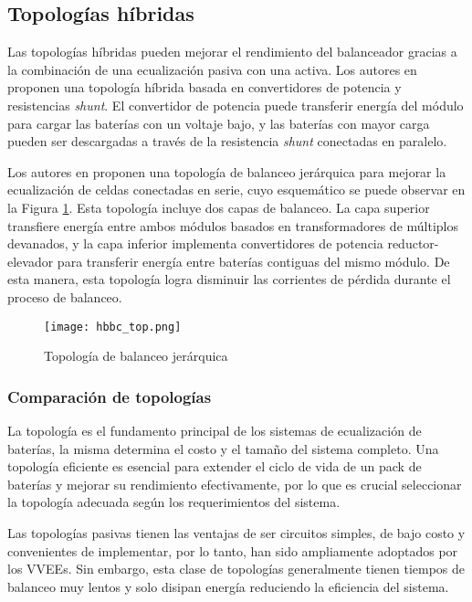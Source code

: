 \subsection{Topolog\'ias h\'ibridas}

Las topolog\'ias h\'ibridas pueden mejorar el rendimiento del balanceador
gracias a la combinaci\'on de una ecualizaci\'on pasiva con una activa. 
Los autores en \cite{fang_bal} proponen una topolog\'ia h\'ibrida basada en 
convertidores de potencia y resistencias \emph{shunt}. El convertidor de 
potencia puede transferir energ\'ia del m\'odulo para cargar las bater\'ias con 
un voltaje bajo, y las bater\'ias con mayor carga pueden ser descargadas a 
trav\'es de la resistencia \emph{shunt} conectadas en paralelo.

Los autores en \cite{zhang_et_al_hier} proponen una topolog\'ia de balanceo 
jer\'arquica para mejorar la ecualizaci\'on de celdas conectadas en serie, cuyo 
esquem\'atico se puede observar en la Figura \ref{hier_bal_top}. Esta 
topolog\'ia incluye dos capas de balanceo. La capa superior transfiere energ\'ia 
entre ambos m\'odulos basados en transformadores de m\'ultiplos devanados, y la 
capa inferior implementa convertidores de potencia reductor-elevador para 
transferir energ\'ia entre bater\'ias contiguas del mismo m\'odulo. De esta 
manera, esta topolog\'ia logra disminuir las corrientes de p\'erdida durante el 
proceso de balanceo.

\begin{figure}[h!]
    \begin{center}
        \texttt{[image: hbbc\_top.png]}
        \caption{Topolog\'ia de balanceo jer\'arquica}
        \label{hier_bal_top}
    \end{center}
\end{figure}

\subsubsection{Comparaci\'on de topolog\'ias}

La topolog\'ia es el fundamento principal de los sistemas de ecualizaci\'on de
bater\'ias, la misma determina el costo y el tamaño del sistema completo. Una
topolog\'ia eficiente es esencial para extender el ciclo de vida de un pack de
bater\'ias y mejorar su rendimiento efectivamente, por lo que es crucial 
seleccionar la topolog\'ia adecuada seg\'un los requerimientos del sistema. 

Las topolog\'ias pasivas tienen las ventajas de ser circuitos simples, de bajo
costo y convenientes de implementar, por lo tanto, han sido ampliamente
adoptados por los \acrshort{VVEE}s. Sin embargo, esta clase de topolog\'ias
generalmente tienen tiempos de balanceo muy lentos y solo disipan energ\'ia
reduciendo la eficiencia del sistema.

